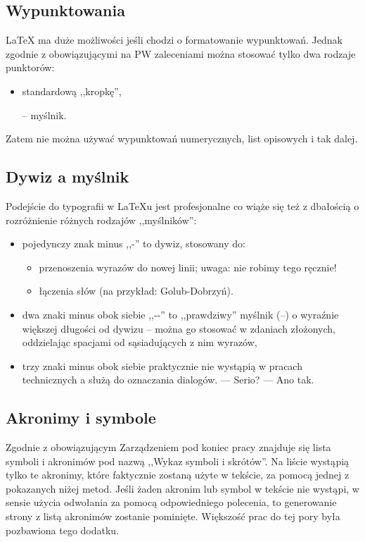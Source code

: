 \subsection{Wypunktowania}
\LaTeX{} ma duże możliwości jeśli chodzi o formatowanie wypunktowań. Jednak zgodnie z obowiązującymi na PW zaleceniami można stosować tylko dwa rodzaje punktorów:
\begin{itemize}
    \item standardową ,,kropkę'',
    \item[--] myślnik.
\end{itemize}
Zatem nie można używać wypunktowań numerycznych, list opisowych i tak dalej.


\subsection{Dywiz a myślnik}
Podejście do typografii w \LaTeX{u} jest profesjonalne co wiąże się też z dbałością o rozróżnienie różnych rodzajów ,,myślników'':
\begin{itemize}
    \item pojedynczy znak minus ,,-'' to dywiz, stosowany do:
    \begin{itemize}
        \item przenoszenia wyrazów do nowej linii; uwaga: nie robimy tego ręcznie!
        \item łączenia słów (na przykład: Golub-Dobrzyń).
    \end{itemize}
    \item dwa znaki minus obok siebie ,,-{}-'' %
    to ,,prawdziwy'' myślnik (--) o wyraźnie większej długości od dywizu -- można go stosować w zdaniach złożonych, oddzielając spacjami od sąsiadujących z nim wyrazów,
    \item trzy znaki minus obok siebie praktycznie nie wystąpią w pracach technicznych a służą do oznaczania dialogów. --- Serio? --- Ano tak.
\end{itemize}

\subsection{Akronimy i symbole}
Zgodnie z obowiązującym Zarządzeniem pod koniec pracy znajduje się lista symboli i akronimów pod nazwą ,,Wykaz symboli i skrótów''. Na liście wystąpią tylko te akronimy, które faktycznie zostaną użyte w tekście, za pomocą jednej z pokazanych niżej metod. Jeśli żaden akronim lub symbol w tekście nie wystąpi, w sensie użycia odwołania za pomocą odpowiedniego polecenia, to generowanie strony z listą akronimów zostanie pominięte. Większość prac do tej pory była pozbawiona tego dodatku.

